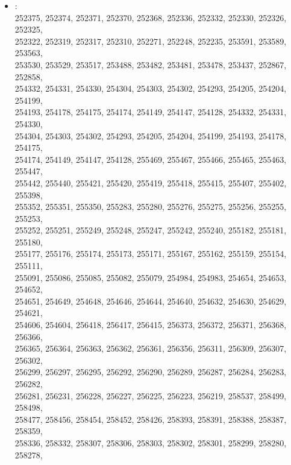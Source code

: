 \begin{appendix}
\vspace{\columnsep}
\begin{itemize}
    \small
    \item[] :\\[5pt]
    \footnotesize
     252375, 252374, 252371, 252370, 252368, 252336, 252332, 252330, 252326, 252325,\\
     252322, 252319, 252317, 252310, 252271, 252248, 252235, 253591, 253589, 253563,\\
     253530, 253529, 253517, 253488, 253482, 253481, 253478, 253437, 252867, 252858,\\
     254332, 254331, 254330, 254304, 254303, 254302, 254293, 254205, 254204, 254199,\\
     254193, 254178, 254175, 254174, 254149, 254147, 254128, 254332, 254331, 254330,\\
     254304, 254303, 254302, 254293, 254205, 254204, 254199, 254193, 254178, 254175,\\
     254174, 254149, 254147, 254128, 255469, 255467, 255466, 255465, 255463, 255447,\\
     255442, 255440, 255421, 255420, 255419, 255418, 255415, 255407, 255402, 255398,\\
     255352, 255351, 255350, 255283, 255280, 255276, 255275, 255256, 255255, 255253,\\
     255252, 255251, 255249, 255248, 255247, 255242, 255240, 255182, 255181, 255180,\\
     255177, 255176, 255174, 255173, 255171, 255167, 255162, 255159, 255154, 255111,\\
     255091, 255086, 255085, 255082, 255079, 254984, 254983, 254654, 254653, 254652,\\
     254651, 254649, 254648, 254646, 254644, 254640, 254632, 254630, 254629, 254621,\\
     254606, 254604, 256418, 256417, 256415, 256373, 256372, 256371, 256368, 256366,\\
     256365, 256364, 256363, 256362, 256361, 256356, 256311, 256309, 256307, 256302,\\
     256299, 256297, 256295, 256292, 256290, 256289, 256287, 256284, 256283, 256282,\\
     256281, 256231, 256228, 256227, 256225, 256223, 256219, 258537, 258499, 258498,\\
     258477, 258456, 258454, 258452, 258426, 258393, 258391, 258388, 258387, 258359,\\
     258336, 258332, 258307, 258306, 258303, 258302, 258301, 258299, 258280, 258278,\\

\end{itemize}
\end{appendix}
